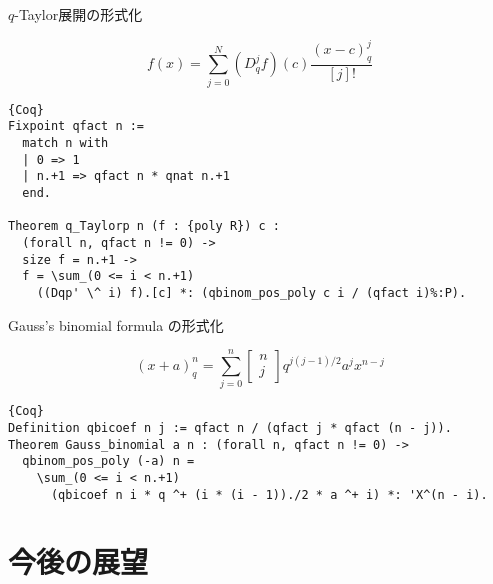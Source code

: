 \documentclass[dvipdfmx,cjk]{beamer}
\theoremstyle{mystyle}
\newcommand{\qcoe}[2]{\left[\begin{array}{ccc}#1\\#2\end{array}\right]}
\newcommand{\0}{\textbf{0}}
\begin{document}
\begin{frame}[fragile]{$q$-Taylor展開の形式化}
	\begin{screen}
		\[
			f(x) = \sum_{j=0}^N (D_q^jf)(c)\frac{(x-c)^j_q}{[j]!}
		\]
	\end{screen}
	\begin{lstlisting}{Coq}
Fixpoint qfact n :=
  match n with
  | 0 => 1
  | n.+1 => qfact n * qnat n.+1
  end.

Theorem q_Taylorp n (f : {poly R}) c :
  (forall n, qfact n != 0) ->
  size f = n.+1 ->
  f = \sum_(0 <= i < n.+1)
    ((Dqp' \^ i) f).[c] *: (qbinom_pos_poly c i / (qfact i)%:P).
\end{lstlisting}
\end{frame}

\begin{frame}[fragile]{Gauss's binomial formula の形式化}
	\begin{screen}
		\[
			(x + a)^n_q = \sum_{j = 0}^n \qcoe{n}{j} q^{j (j - 1)/2} a^j x^{n - j}
		\]
	\end{screen}
	\begin{lstlisting}{Coq}
Definition qbicoef n j := qfact n / (qfact j * qfact (n - j)).
Theorem Gauss_binomial a n : (forall n, qfact n != 0) ->
  qbinom_pos_poly (-a) n =
    \sum_(0 <= i < n.+1)
      (qbicoef n i * q ^+ (i * (i - 1))./2 * a ^+ i) *: 'X^(n - i). \end{lstlisting}
\end{frame}
\section{今後の展望}

\begin{frame}
	\tableofcontents[currentsection] 
\end{frame}
\end{document}
